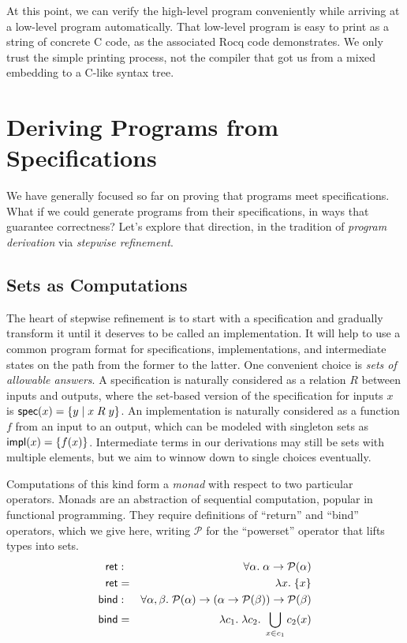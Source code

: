 \documentclass{amsbook}
\theoremstyle{definition}
\theoremstyle{remark}
\numberwithin{section}{chapter}
\numberwithin{equation}{chapter}
\begin{document}
At this point, we can verify the high-level program conveniently while arriving at a low-level program automatically.
That low-level program is easy to print as a string of concrete C code, as the associated Rocq code demonstrates.
We only trust the simple printing process, not the compiler that got us from a mixed embedding to a C-like syntax tree.



\chapter{Deriving Programs from Specifications}\label{deriving}

We have generally focused so far on proving that programs meet specifications.
What if we could generate programs from their specifications, in ways that guarantee correctness?
Let's explore that direction, in the tradition of \emph{program derivation} via \emph{stepwise refinement}.

\section{Sets as Computations}

The heart of stepwise refinement is to start with a specification and gradually transform it until it deserves to be called an implementation.
It will help to use a common program format for specifications, implementations, and intermediate states on the path from the former to the latter.
One convenient choice is \emph{sets of allowable answers}.
A specification is naturally considered as a relation $R$ between inputs and outputs, where the set-based version of the specification for inputs $x$ is $\mathsf{spec}(x) = \{y \mid x \; R \; y\}$.
An implementation is naturally considered as a function $f$ from an input to an output, which can be modeled with singleton sets as $\mathsf{impl}(x) = \{f(x)\}$.
Intermediate terms in our derivations may still be sets with multiple elements, but we aim to winnow down to single choices eventually.

Computations of this kind form a \emph{monad} with respect to two particular operators.
Monads are an abstraction of sequential computation, popular in functional programming.
They require definitions of ``return'' and ``bind'' operators, which we give here, writing $\mathcal P$ for the ``powerset'' operator that lifts types into sets.
\begin{eqnarray*}
  \mathsf{ret} &:& \forall \alpha. \; \alpha \to \mathcal P(\alpha) \\
  \mathsf{ret} &=& \lambda x. \; \{x\} \\
  \mathsf{bind} &:& \forall \alpha, \beta. \; \mathcal P(\alpha) \to (\alpha \to \mathcal P(\beta)) \to \mathcal P(\beta) \\
  \mathsf{bind} &=& \lambda c_1. \; \lambda c_2. \; \bigcup_{x \in c_1} c_2(x)
\end{eqnarray*}
\end{document}

